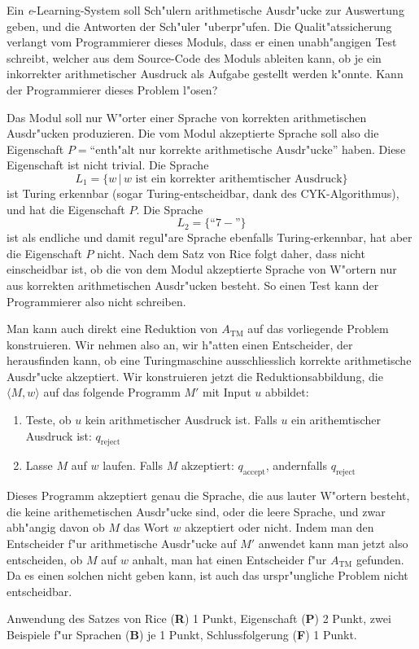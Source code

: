 Ein {\it e}-Learning-System soll Sch"ulern arithmetische Ausdr"ucke
zur Auswertung geben, und die Antworten der Sch"uler "uberpr"ufen.
Die Qualit"atssicherung verlangt vom Programmierer dieses Moduls, dass
er einen unabh"angigen Test schreibt, welcher aus dem Source-Code
des Moduls ableiten kann, ob je ein inkorrekter arithmetischer Ausdruck
als Aufgabe gestellt werden k"onnte. Kann der Programmierer dieses
Problem l"osen?

\begin{loesung}
Das Modul soll nur W"orter einer Sprache von korrekten arithmetischen
Ausdr"ucken produzieren.
Die vom Modul akzeptierte Sprache soll also die Eigenschaft
$P=\text{``enth"alt nur korrekte arithmetische Ausdr"ucke''}$
haben. 
Diese Eigenschaft ist nicht trivial. Die Sprache
\[
L_1=\{w\,|\,\text{$w$ ist ein korrekter arithemtischer Ausdruck}\}
\]
ist Turing erkennbar (sogar Turing-entscheidbar, dank des CYK-Algorithmus),
und hat die Eigenschaft $P$.
Die Sprache
\[
L_2=\{ \text{``$7-$''}\}
\]
ist als endliche und damit regul"are Sprache ebenfalls Turing-erkennbar,
hat aber die Eigenschaft $P$ nicht. Nach dem Satz von Rice folgt daher,
dass nicht einscheidbar ist, ob die von dem Modul akzeptierte Sprache
von W"ortern nur aus korrekten arithmetischen Ausdr"ucken besteht.
So einen Test kann der Programmierer also nicht schreiben.
\end{loesung}

\begin{loesung}
Man kann auch direkt eine Reduktion von $A_{\text{TM}}$ auf das vorliegende
Problem konstruieren.  Wir nehmen also an, wir h"atten einen Entscheider,
der herausfinden kann, ob eine Turingmaschine ausschliesslich korrekte
arithmetische Ausdr"ucke akzeptiert. Wir konstruieren jetzt die
Reduktionsabbildung, die $\langle M,w\rangle$ auf das folgende
Programm $M'$ mit Input $u$ abbildet:
\begin{enumerate}
\item Teste, ob $u$ kein arithmetischer Ausdruck ist. Falls 
$u$ ein arithemtischer Ausdruck ist: $q_\text{reject}$
\item Lasse $M$ auf $w$ laufen. Falls $M$ akzeptiert: $q_\text{accept}$,
andernfalls $q_\text{reject}$
\end{enumerate}
Dieses Programm akzeptiert genau die Sprache, die aus lauter W"ortern
besteht, die keine arithemetischen Ausdr"ucke sind, oder die leere
Sprache, und zwar abh"angig davon ob $M$ das Wort $w$ akzeptiert
oder nicht. Indem man den Entscheider f"ur arithmetische Ausdr"ucke
auf $M'$ anwendet kann man jetzt also entscheiden, ob $M$ auf $w$
anhalt, man hat einen Entscheider f"ur $A_\text{TM}$ gefunden.
Da es einen solchen nicht geben kann, ist auch das urspr"ungliche
Problem nicht entscheidbar.
\end{loesung}

\begin{bewertung}
Anwendung des Satzes von Rice ({\bf R}) 1 Punkt,
Eigenschaft ({\bf P}) 2 Punkt,
zwei Beispiele f"ur Sprachen ({\bf B}) je 1 Punkt,
Schlussfolgerung ({\bf F}) 1 Punkt.
\end{bewertung}
